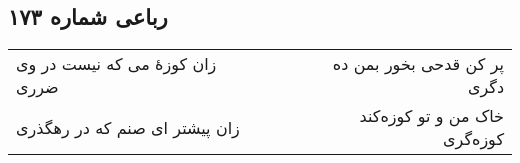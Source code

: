 \begin{center}
\section*{رباعی شماره ۱۷۳}
\label{sec:sh173}
\begin{longtable}{l p{0.5cm} r}
زان کوزهٔ می که نیست در وی ضرری
&&
پر کن قدحی بخور بمن ده دگری
\\
زان پیشتر ای صنم که در رهگذری
&&
خاک من و تو کوزه‌کند کوزه‌گری
\\
\end{longtable}
\end{center}
